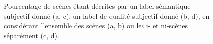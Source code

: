 \begin{figure}[t]
        \myfloatalign
         \par
       \caption{Pourcentage de scènes étant décrites par un label sémantique subjectif donné (a, c), un label de qualité subjectif donné (b, d), en considérant l'ensemble des scènes (a, b) ou les i- et ni-scènes séparément (c, d).}\label{fig:countLabel}
\end{figure}

